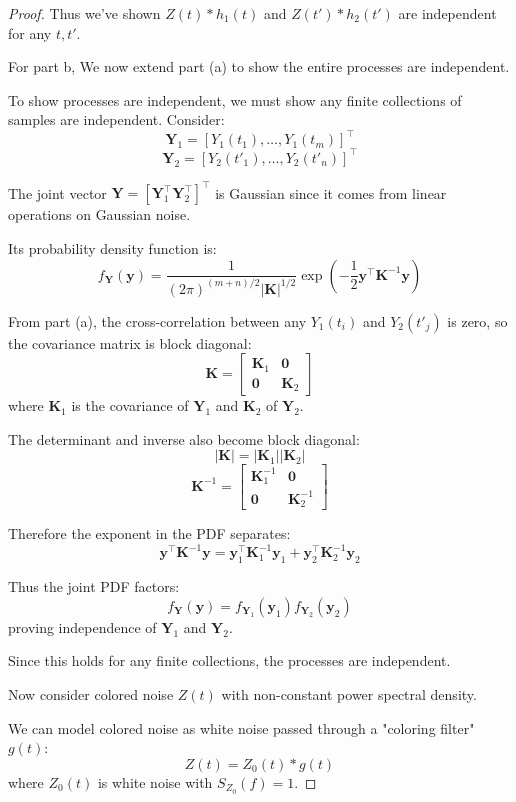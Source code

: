 \documentclass[../main.tex]{subfiles}
\begin{document}
\begin{proof}
Thus we've shown $Z(t)*h_1(t)$ and $Z(t')*h_2(t')$ are independent for any $t,t'$.


For part b,
We now extend part (a) to show the entire processes are independent.

To show processes are independent, we must show any finite collections of samples are independent. Consider:
\[ \mathbf{Y}_1 = [Y_1(t_1),\ldots,Y_1(t_m)]^\top \]
\[ \mathbf{Y}_2 = [Y_2(t'_1),\ldots,Y_2(t'_n)]^\top \]

The joint vector $\mathbf{Y} = [\mathbf{Y}_1^\top \mathbf{Y}_2^\top]^\top$ is Gaussian since it comes from linear operations on Gaussian noise.

Its probability density function is:
\[ f_{\mathbf{Y}}(\mathbf{y}) = \frac{1}{(2\pi)^{(m+n)/2}|\mathbf{K}|^{1/2}}\exp\left(-\frac{1}{2}\mathbf{y}^\top\mathbf{K}^{-1}\mathbf{y}\right) \]

From part (a), the cross-correlation between any $Y_1(t_i)$ and $Y_2(t'_j)$ is zero, so the covariance matrix is block diagonal:
\[ \mathbf{K} = \begin{bmatrix} \mathbf{K}_1 & \mathbf{0} \\ \mathbf{0} & \mathbf{K}_2 \end{bmatrix} \]
where $\mathbf{K}_1$ is the covariance of $\mathbf{Y}_1$ and $\mathbf{K}_2$ of $\mathbf{Y}_2$.

The determinant and inverse also become block diagonal:
\[ |\mathbf{K}| = |\mathbf{K}_1||\mathbf{K}_2| \]
\[ \mathbf{K}^{-1} = \begin{bmatrix} \mathbf{K}_1^{-1} & \mathbf{0} \\ \mathbf{0} & \mathbf{K}_2^{-1} \end{bmatrix} \]

Therefore the exponent in the PDF separates:
\[ \mathbf{y}^\top\mathbf{K}^{-1}\mathbf{y} = \mathbf{y}_1^\top\mathbf{K}_1^{-1}\mathbf{y}_1 + \mathbf{y}_2^\top\mathbf{K}_2^{-1}\mathbf{y}_2 \]

Thus the joint PDF factors:
\[ f_{\mathbf{Y}}(\mathbf{y}) = f_{\mathbf{Y}_1}(\mathbf{y}_1)f_{\mathbf{Y}_2}(\mathbf{y}_2) \]
proving independence of $\mathbf{Y}_1$ and $\mathbf{Y}_2$.

Since this holds for any finite collections, the processes are independent.



Now consider colored noise $Z(t)$ with non-constant power spectral density.

We can model colored noise as white noise passed through a "coloring filter" $g(t)$:
\[ Z(t) = Z_0(t) * g(t) \]
where $Z_0(t)$ is white noise with $S_{Z_0}(f) = 1$.


\end{proof}
\end{document}
